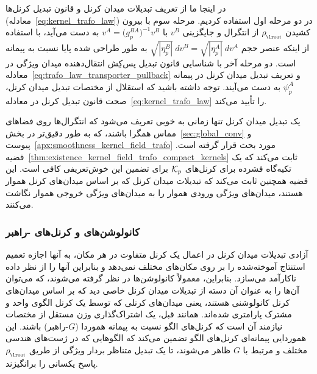 در اینجا ما از تعریف تبدیلات میدان کرنل و قانون تبدیل کرنل‌ها (معادله~\eqref{eq:kernel_trafo_law}) در دو مرحله اول استفاده کردیم.
مرحله سوم با بیرون کشیدن $\rhoout$ از انتگرال و جایگزینی $v^B$ با $v^A = \big(g_p^{BA}\big)^{-1} v^B$ به دست می‌آید، با استفاده از اینکه عنصر حجم $\sqrt{|\eta_p^B|}\ dv^B = \sqrt{|\eta_p^A|}\ dv^A$ به طور طراحی شده پایا نسبت به پیمانه است.
دو مرحله آخر با شناسایی قانون تبدیل پس‌کِش انتقال‌دهنده میدان ویژگی در معادله~\eqref{eq:trafo_law_transporter_pullback} و تعریف تبدیل میدان کرنل در پیمانه $\psi_p^A$ به دست می‌آیند.
توجه داشته باشید که استقلال از مختصات تبدیل میدان کرنل، صحت قانون تبدیل کرنل در معادله~\eqref{eq:kernel_trafo_law} را تأیید می‌کند.

یک تبدیل میدان کرنل تنها زمانی به خوبی تعریف می‌شود که انتگرال‌ها روی فضاهای مماس همگرا باشند، که به طور دقیق‌تر در بخش~\ref{sec:global_conv} و پیوست~\ref{apx:smoothness_kernel_field_trafo} مورد بحث قرار گرفته است.
قضیه~\ref{thm:existence_kernel_field_trafo_compact_kernels} ثابت می‌کند که یک تکیه‌گاه فشرده برای کرنل‌های $\mathcal{K}_p$ برای تضمین این خوش‌تعریفی کافی است.
این قضیه همچنین ثابت می‌کند که تبدیلات میدان کرنل که بر اساس میدان‌های کرنل هموار هستند، میدان‌های ویژگی ورودی هموار را به میدان‌های ویژگی خروجی هموار نگاشت می‌کنند.

\subsubsection{کانولوشن‌های \textit{} و کرنل‌های \textit{}-راهبر}
\label{sec:gauge_conv}

آزادی تبدیلات میدان کرنل در اعمال یک کرنل متفاوت در هر مکان، به آنها اجازه تعمیم استنتاج آموخته‌شده را بر روی مکان‌های مختلف نمی‌دهد و بنابراین آنها را از نظر داده ناکارآمد می‌سازد.
بنابراین، معمولاً کانولوشن‌ها در نظر گرفته می‌شوند، که می‌توان آن‌ها را به عنوان آن دسته از تبدیلات میدان کرنل خاصی دید که بر اساس میدان‌های کرنل کانولوشنی هستند، یعنی میدان‌های کرنلی که توسط یک کرنل الگوی واحد و مشترک پارامتری شده‌اند.
همانند قبل، یک اشتراک‌گذاری وزن مستقل از مختصات نیازمند آن است که کرنل‌های الگو نسبت به پیمانه هموردا ($G$-راهبر) باشند.
این هموردایی پیمانه‌ای کرنل‌های الگو تضمین می‌کند که الگوهایی که در ژست‌های هندسی مختلف و مرتبط با $G$ ظاهر می‌شوند، تا یک تبدیل متناظر بردار ویژگی از طریق $\rhoout$ پاسخ یکسانی را برانگیزند.

